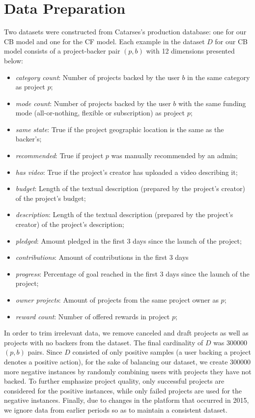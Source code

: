 \documentclass[cic,tc,english]{iiufrgs}
\begin{document}
\section{Data Preparation} 
\label{data-preparation}
Two datasets were constructed from Catarses's production database: one for our CB model and one for the CF model. Each example in the dataset \(D\) for our CB model consists of a project-backer pair \((p,b)\) with 12 dimensions presented below:
\begin{itemize}

    \item \emph{category count}: Number of projects backed by the user \(b\) in the same category as project \(p\);
    \item \emph{mode count}: Number of projects backed by the user \(b\) with the same funding mode (all-or-nothing, flexible or subscription) as project \(p\);
    \item \emph{same state}: True if the project geographic location is the same as the backer's;
    \item \emph{recommended}: True if project \(p\) was manually recommended by an admin;
    \item \emph{has video}: True if the project's creator has uploaded a video describing it;
    \item \emph{budget}: Length of the textual description (prepared by the project's creator) of the project's budget;
    \item \emph{description}: Length of the textual description (prepared by the project's creator) of the project's description;
    \item \emph{pledged}: Amount pledged in the first 3 days since the launch of the project;
    \item \emph{contributions}: Amount of contributions in the first 3 days
    \item \emph{progress}: Percentage of goal reached in the first 3 days since the launch of the project;
    \item \emph{owner projects}: Amount of projects from the same project owner as \(p\);
    \item \emph{reward count}: Number of offered rewards in project \(p\);
\end{itemize}

In order to trim irrelevant data, we remove canceled and draft projects as well as projects with no backers from the dataset. The final cardinality of \(D\) was 300000 $(p,b)$ pairs. Since $D$ consisted of only positive samples (a user backing a project denotes a positive action), for the sake of balancing our dataset, we create 300000 more negative instances by randomly combining users with projects they have not backed. To further emphasize project quality, only successful projects are considered for the positive instances, while only failed projects are used for the negative instances. Finally, due to changes in the platform that occurred in 2015, we ignore data from earlier periods so as to maintain a consistent dataset.
\end{document}
